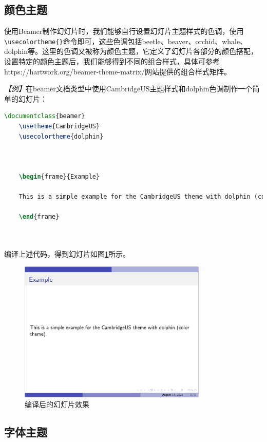 \subsection{颜色主题}

使用Beamer制作幻灯片时，我们能够自行设置幻灯片主题样式的色调，使用\texttt{\textbackslash{}usecolortheme\{\}}命令即可，这些色调包括beetle、beaver、orchid、whale、dolphin等。这里的色调又被称为颜色主题，它定义了幻灯片各部分的颜色搭配，设置特定的颜色主题后，我们能够得到不同的组合样式，具体可参考https://hartwork.org/beamer-theme-matrix/网站提供的组合样式矩阵。

\emph{【例】}在beamer文档类型中使用CambridgeUS主题样式和dolphin色调制作一个简单的幻灯片：
\begin{lstlisting}[language=TeX]
    \documentclass{beamer}
    \usetheme{CambridgeUS}
    \usecolortheme{dolphin}

    

    \begin{frame}{Example}

    This is a simple example for the CambridgeUS theme with dolphin (color theme).

    \end{frame}

    
\end{lstlisting}

编译上述代码，得到幻灯片如图\ref{fig:927}所示。

\begin{figure}[htbp]
    \centering
    \includegraphics[width = 0.8\textwidth]{images/ch_9/example_sec2_2.png}
    \caption{编译后的幻灯片效果}
    \label{fig:927}
\end{figure}

\subsection{字体主题}

